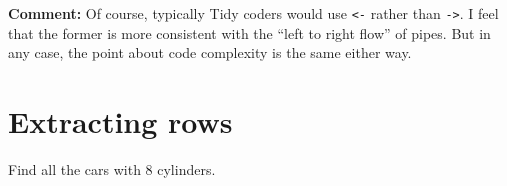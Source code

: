 \documentclass[11pt]{article}
\begin{document}
\begin{parcolumns}[rulebetween=true]{2}


\hspace{0.1in}


\end{parcolumns}

\bigskip

\textbf{Comment:}
Of course, typically Tidy coders would use \lstinline{<-}
rather than \lstinline{->}.  I feel that the former is more
consistent with the ``left to right flow'' of pipes.  But in any case,
the point about code complexity is the same either way.

\section*{Extracting rows}

Find all the cars with 8 cylinders.
\end{document}
